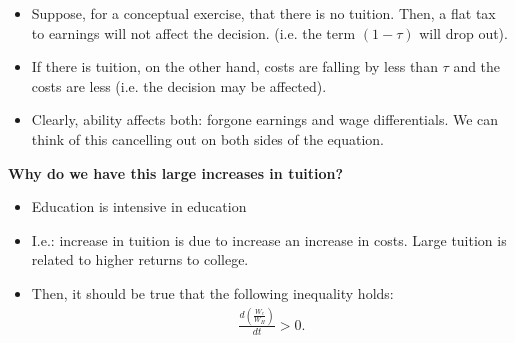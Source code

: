 \documentclass[14pt,notitlepage]{article}
\begin{document}
\begin{itemize}
\begin{itemize}
    \item Suppose, for a conceptual exercise, that there is no tuition. Then, a flat tax to earnings will not affect the decision. (i.e. the term $(1-\tau)$ will drop out).

    \item If there is tuition, on the other hand, costs are falling by less than $\tau$ and the costs are less (i.e. the decision may be affected).

    \item Clearly, ability affects both: forgone earnings and wage differentials. We can think of this cancelling out on both sides of the equation.
    \end{itemize}
\end{itemize}

\textbf{Why do we have this large increases in tuition?}

\begin{itemize}
\item Education is intensive in education
\item I.e.: increase in tuition is due to increase an increase in costs. Large tuition is related to higher returns to college.
\item Then, it should be true that the following inequality holds:
\begin{align*}
\frac{d(\frac{W_c}{W_H})}{dt} > 0.
\end{align*}
\end{itemize}
\end{document}
